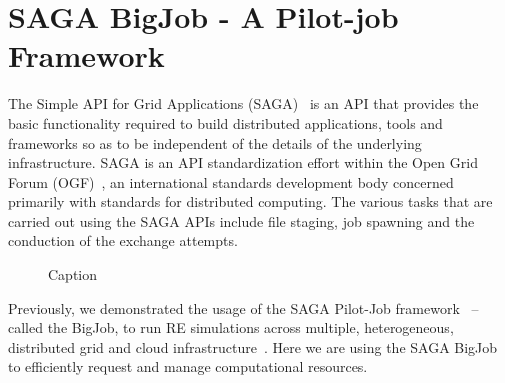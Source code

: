 \documentclass[a4paper,10pt]{article}
\begin{document}
\section{SAGA BigJob - A Pilot-job Framework}

The Simple API for Grid Applications (SAGA)~\cite{saga_gfd90} is an API that provides the basic functionality required to build distributed applications, tools and frameworks so as to be independent of the details of the underlying infrastructure. SAGA is an API standardization effort within the Open Grid Forum (OGF)~\cite{ogf_web}, an international standards development body concerned primarily with standards for distributed computing. The various tasks that are carried out using the SAGA APIs include file staging, job spawning and the conduction of the exchange attempts.


 \begin{figure}
\centering
%
\label{fig:sync}
\caption{\small Caption}
\end{figure}


Previously, we demonstrated the usage of the SAGA Pilot-Job framework~\cite{saga_bigjob_condor_cloud} -- called the BigJob, to run RE simulations across multiple, heterogeneous, distributed grid and cloud infrastructure~\cite{Luckow:2008fp}. Here we are using the SAGA BigJob to efficiently request and manage computational resources. 
\end{document}
